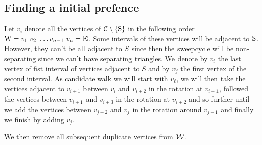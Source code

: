 \subsection{Finding a initial prefence}
  Let $v_i$ denote all the vertices of $\mathcal{C} \setminus \left\lbrace {\mathrm{S}} \right\rbrace$ in the following order $\mathrm{W} =  v_1 \  v_2 \  \ldots v_{n-1} \  v_n = \mathrm{E}$.
  Some intervals of these vertices will be adjacent to $\mathrm{S}$. However, they can't be all adjacent to $S$ since then the sweepcycle will be non-separating since we can't have separating triangles. We denote by $v_i$ the last vertex of fist interval of vertices adjacent to $S$ and by $v_j$ the first vertex of the second interval.
  As candidate walk we will start with $v_i$, we will then take the vertices adjacent to $v_{i+1}$ between $v_i$ and $v_{i+2}$ in the rotation at $v_{i+1}$, followed the vertices between $v_{i+1}$ and $v_{i+3}$ in the rotation at $v_{i+2}$ and so further until we add the vertices between $v_{j-2}$ and $v_j$ in the rotation around $v_{j-1}$ and finally we finish by adding $v_j$.

  We then remove all subsequent duplicate vertices from $\mathcal{W}$.

